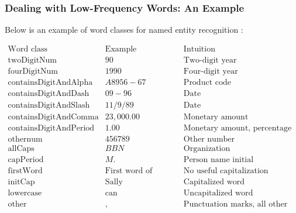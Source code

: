 \documentclass[handout]{beamer}
\begin{document}
\begin{frame}
  \frametitle{Dealing with Low-Frequency Words: An Example}
  \scriptsize
  
 Below is an example of word classes for named entity recognition \cite{bikelSW99}:
  
  \[
    \begin{array}{l|l|l}
      \text{Word class} & \text{Example}  & \text{Intuition} \\
      \hline
      \text{twoDigitNum} & 90 & \text{Two-digit year} \\
      \text{fourDigitNum} & 1990 & \text{Four-digit year} \\
      \text{containsDigitAndAlpha} & A8956-67 & \text{Product code} \\
      \text{containsDigitAndDash} & 09-96 & \text{Date} \\
      \text{containsDigitAndSlash} & 11/9/89 & \text{Date} \\
      \text{containsDigitAndComma} & 23,000.00 & \text{Monetary amount} \\
      \text{containsDigitAndPeriod} & 1.00 & \text{Monetary amount, percentage} \\
      \text{othernum} & 456789 & \text{Other number} \\
      \text{allCaps} & BBN & \text{Organization} \\
      \text{capPeriod} & M. & \text{Person name initial} \\
      \text{firstWord} & \text{First word of sentence} & \text{No useful capitalization information} \\
      \text{initCap} & \text{Sally} & \text{Capitalized word} \\
      \text{lowercase} & \text{can} & \text{Uncapitalized word} \\
      \text{other} & , & \text{Punctuation marks, all other words} \\
    \end{array}
  \]
\end{frame}
\end{document}
